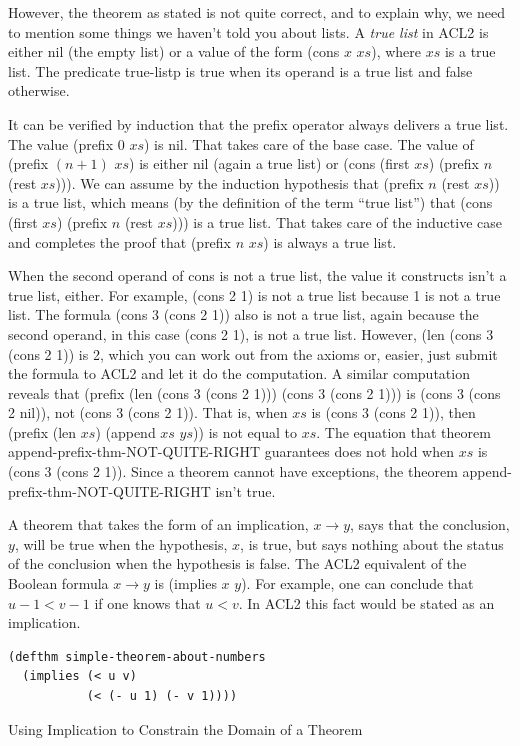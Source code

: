 However, the theorem as stated
is not quite correct,
and to explain why, we need to mention
some things we haven't told you about lists. A
\label{true-list-def}\emph{true list}
in ACL2 is either \textsf{nil} (the empty list)
or a value of the form \textsf{(cons $x$ $xs$)},
where $xs$ is a true list.
The predicate
\textsf{true-listp}
is true when its operand
is a true list and false otherwise.

It can be verified by induction that
the \textsf{prefix} operator always delivers a true list.
The value \textsf{(prefix 0 $xs$)} is \textsf{nil}.
That takes care of the base case.
The value of \textsf{(prefix $(n+1)$ $xs$)} is either \textsf{nil}
(again a true list)
or \textsf{(cons (first $xs$) (prefix $n$ (rest $xs$)))}.
We can assume by the induction hypothesis that
\textsf{(prefix $n$ (rest $xs$))} is a true list,
which means (by the definition of the term ``true list'')
that \textsf{(cons (first $xs$) (prefix $n$ (rest $xs$)))} is a true list.
That takes care of the inductive case and completes the proof
that \textsf{(prefix $n$ $xs$)} is always a true list.

When the second operand of \textsf{cons} is not a true list,
the value it constructs isn't a true list, either.
For example, \textsf{(cons 2 1)} is not a true list because 1 is not a true list.
The formula \textsf{(cons 3 (cons 2 1))} also is not a true list,
again because the second operand,
in this case \textsf{(cons 2 1)}, is not a true list.
However, \textsf{(len (cons 3 (cons 2 1))} is \textsf{2}, which you can work
out from the axioms or, easier,
just submit the formula to ACL2 and let it do the computation.
A similar computation reveals that
\textsf{(prefix (len (cons 3 (cons 2 1))) (cons 3 (cons 2 1)))}
is \textsf{(cons 3 (cons 2 nil))}, not \textsf{(cons 3 (cons 2 1))}.
That is, when $xs$ is \textsf{(cons 3 (cons 2 1))},
then \textsf{(prefix (len $xs$) (append $xs$ $ys$))} is not equal to $xs$.
The equation that theorem append-prefix-thm-NOT-QUITE-RIGHT
guarantees does not hold when $xs$ is \textsf{(cons 3 (cons 2 1))}.
Since a theorem cannot have exceptions,
the theorem append-prefix-thm-NOT-QUITE-RIGHT
isn't true.

\begin{aside}
A theorem that takes the form of an implication, $x \rightarrow y$,
says that the conclusion, $y$, will be true when the hypothesis, $x$,
is true, but says nothing about the status of the conclusion when
the hypothesis is false. The ACL2 equivalent of the Boolean formula $x \rightarrow y$
is \textsf{(implies $x$ $y$)}.
For example, one can conclude that $u - 1 < v - 1$
if one knows that $u < v$.
In ACL2 this fact would be stated as an implication.
\begin{Verbatim}
(defthm simple-theorem-about-numbers
  (implies (< u v)
           (< (- u 1) (- v 1))))
\end{Verbatim}
\caption{Using Implication to Constrain the Domain of a Theorem}
\label{thm-with-implies}
\end{aside}

